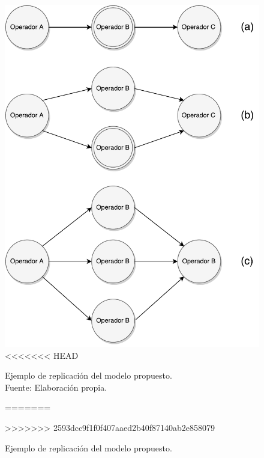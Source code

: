 \begin{figure}[!ht]
	\centering
		\includegraphics[scale=0.6]{images/EjReplicacion.pdf}
<<<<<<< HEAD
	\caption[Ejemplo de replicación del modelo propuesto.]{Ejemplo de replicación del modelo propuesto.\\Fuente: Elaboración propia.}
=======
	\caption{Ejemplo de replicaci\'on del modelo propuesto.}
>>>>>>> 2593dcc9f1f0f407aaed2b40f87140ab2e858079
	\label{fig:ejReplicacion}
\end{figure}



